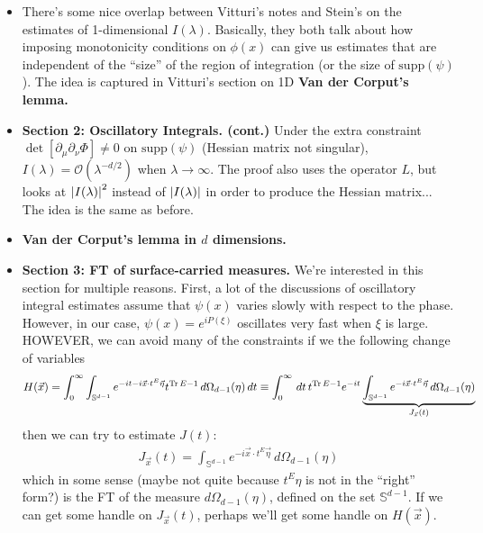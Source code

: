 \documentclass{article}
\theoremstyle{definition}
\newcommand{\p}{\partial}
\begin{document}
\begin{itemize}
    
    
    
    \item There's some nice overlap between Vitturi's notes and Stein's on the estimates of 1-dimensional $I(\lambda)$. Basically, they both talk about how imposing monotonicity conditions on $\phi(x)$ can give us estimates that are independent of the ``size'' of the region of integration (or the size of $\text{supp}(\psi)$). The idea is captured in Vitturi's section on 1D \textbf{Van der Corput's lemma.} 
    
    
    
    \item \textbf{Section 2: Oscillatory Integrals. (cont.)} Under the extra constraint $\det [\p_\mu \p_\nu \Phi] \neq 0$ on $\text{supp}(\psi)$ (Hessian matrix not singular), $I(\lambda) = \mathcal{O}(\lambda^{-d/2})$ when $\lambda \to \infty$. The proof also uses the operator $L$, but looks at $\abs{I(\lambda)}^2$ instead of $\abs{I(\lambda)}$ in order to produce the Hessian matrix... The idea is the same as before. 
    
    
    
    
    
    \item \textbf{Van der Corput's lemma in $d$ dimensions.}  
    
    
    \item \textbf{Section 3: FT of surface-carried measures.} We're interested in this section for multiple reasons. First, a lot of the discussions of oscillatory integral estimates assume that $\psi(x)$ varies slowly with respect to the phase. However, in our case, $\psi(x) = e^{iP(\xi)}$ oscillates very fast when $\xi$ is large. HOWEVER, we can avoid many of the constraints if we the following change of variables
    \begin{align*}
    H(\vec{x}) = \int_0^\infty \int_{\mathbb{S}^{d-1}} e^{-it - i \vec{x}\cdot t^E \vec{\eta}}t^{\Tr E - 1}\,d\Omega_{d-1}(\eta)\,dt \equiv \int^\infty_0 \,dt\, t^{\Tr E - 1} e^{-it}\underbrace{\int_{\mathbb{S}^{d-1}} e^{-i\vec{x}\cdot t^E \vec{\eta}}\,d\Omega_{d-1}(\eta)}_{J_{\vec{x}}(t)}
    \end{align*}
    then we can try to estimate $J(t)$:
    \begin{align*}
        J_{\vec{x}}(t) = \int_{\mathbb{S}^{d-1}} e^{-i\vec{x}\cdot t^E \vec{\eta}}\,d\Omega_{d-1}(\eta)
    \end{align*}
    which in some sense (maybe not quite because $t^E \eta$ is not in the ``right'' form?) is the FT of the measure $d\Omega_{d-1}(\eta)$, defined on the set $\mathbb{S}^{d-1}$. If we can get some handle on $J_{\vec{x}}(t)$, perhaps we'll get some handle on $H(\vec{x})$. \\
    

\end{itemize}
\end{document}
